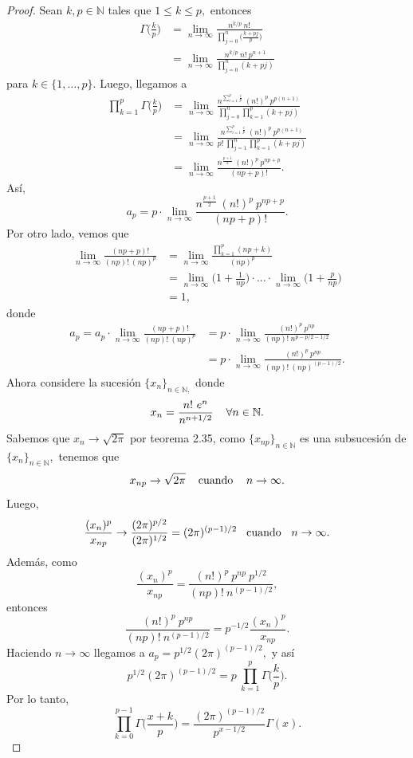 \begin{proof}
	Sean $k,p \in \mathbb{N}$ tales que $1 \leq k \leq p,$ entonces
	\begin{align*}
		\Gamma\bigg(\frac{k}{p}\bigg) &= \lim_{n \rightarrow \infty}\frac{n^{k/p}\ n!}{\prod_{j = 0}^{n}\big(\frac{k+pj}{p}\big)}\\
		&= \lim_{n \rightarrow \infty}\frac{n^{k/p}\ n!\ p^{n+1}}{\prod_{j = 0}^{n}(k+pj)}
	\end{align*}
	para $k \in \{1,\dots,p\}.$ Luego, llegamos a
	\begin{align*}
		\prod_{k = 1}^{p}\Gamma\bigg(\frac{k}{p}\bigg) &= \lim_{n \rightarrow \infty}\frac{n^{\sum_{i = 1}^{p}\frac{i}{p}}\ (n!)^p\ p^{p(n+1)}}{\prod_{j = 0}^{n}\prod_{k = 1}^{p}(k+pj)}\\
		&= \lim_{n \rightarrow \infty}\frac{n^{\sum_{i = 1}^{p}\frac{i}{p}}\ (n!)^p\ p^{p(n+1)}}{p!\ \prod_{j = 1}^{n}\prod_{k = 1}^{p}(k+pj)}\\
		&= \lim_{n \rightarrow \infty}\frac{n^{\frac{p+1}{2}}\ (n!)^p\ p^{np+p}}{(np+p)!}.
	\end{align*}
	Así, $$a_p = p \cdot \lim_{n \rightarrow \infty}\frac{n^{\frac{p+1}{2}}\ (n!)^p\ p^{np+p}}{(np+p)!}.$$
	Por otro lado, vemos que 
	\begin{align*}
		\lim_{n \rightarrow \infty}\frac{(np+p)!}{(np)!\ (np)^p} &= \lim_{n \rightarrow \infty}\frac{\prod_{k = 1}^{p}(np+k)}{(np)^p}\\
		&= \lim_{n \rightarrow \infty}\bigg(1+\frac{1}{np}\bigg)\cdot ... \cdot \lim_{n \rightarrow \infty}\bigg(1+\frac{p}{np}\bigg)\\
		&= 1,
	\end{align*}
	donde
	\begin{align*}
		a_p = a_p\cdot \lim_{n \rightarrow \infty}\frac{(np+p)!}{(np)!\ (np)^p} &= p\cdot \lim_{n \rightarrow \infty}\frac{(n!)^p\ p^{np}}{(np)!\ n^{p-p/2-1/2}}\\
		&= p \cdot \lim_{n \rightarrow \infty}\frac{(n!)^p\ p^{np}}{(np)!\ (np)^{(p-1)/2}}.
	\end{align*}
	Ahora considere la sucesión $\{x_n\}_{n \in \mathbb{N},}$ donde $$x_n = \frac{n!\ e^n}{n^{n+1/2}}\hspace{0.4cm}\forall n \in \mathbb{N}.$$ Sabemos que $x_n \rightarrow \sqrt{2\pi}$ por teorema 2.35, como $\{x_{np}\}_{n \in \mathbb{N}}$ es una subsucesión de $\{x_n\}_{n \in \mathbb{N}},$ tenemos que $$x_{np} \rightarrow \sqrt{2\pi}\hspace{0.4cm}\textrm{cuando }\hspace{0.3cm}n \rightarrow \infty.$$
	Luego, $$\frac{(x_n)^p}{x_{np}} \rightarrow \frac{(2\pi)^{p/2}}{(2\pi)^{1/2}} = (2\pi)^{(p-1)/2}\hspace{0.3cm}\textrm{cuando }\hspace{0.2cm}n \rightarrow \infty.$$
	Además, como $$\frac{(x_n)^p}{x_{np}} = \frac{(n!)^p\ p^{np}\ p^{1/2}}{(np)!\ n^{(p-1)/2}},$$ entonces $$\frac{(n!)^p\ p^{np}}{(np)!\ n^{(p-1)/2}} = p^{-1/2}\frac{(x_n)^p}{x_{np}}.$$
	Haciendo $n \rightarrow \infty$ llegamos a $a_p = p^{1/2}(2\pi)^{(p-1)/2},$ y así $$p^{1/2}(2\pi)^{(p-1)/2} = p\ \prod_{k = 1}^{p}\Gamma\bigg(\frac{k}{p}\bigg).$$ Por lo tanto, $$\prod_{k = 0}^{p-1}\Gamma\bigg(\frac{x+k}{p}\bigg) = \frac{(2\pi)^{(p-1)/2}}{p^{x-1/2}}\Gamma(x).$$
\end{proof}
